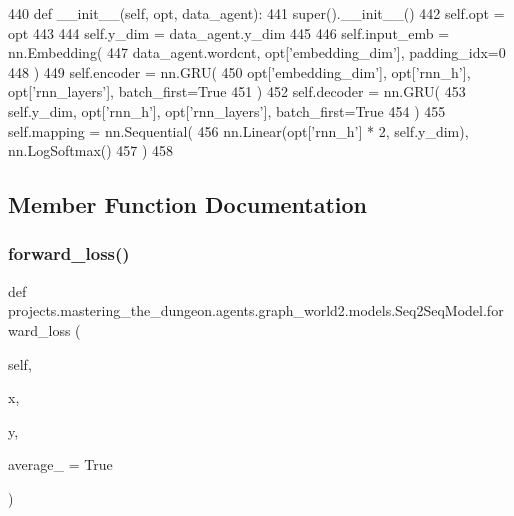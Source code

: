 \begin{DoxyCode}
440     \textcolor{keyword}{def }\_\_init\_\_(self, opt, data\_agent):
441         super().\_\_init\_\_()
442         self.opt = opt
443 
444         self.y\_dim = data\_agent.y\_dim
445 
446         self.input\_emb = nn.Embedding(
447             data\_agent.wordcnt, opt[\textcolor{stringliteral}{'embedding\_dim'}], padding\_idx=0
448         )
449         self.encoder = nn.GRU(
450             opt[\textcolor{stringliteral}{'embedding\_dim'}], opt[\textcolor{stringliteral}{'rnn\_h'}], opt[\textcolor{stringliteral}{'rnn\_layers'}], batch\_first=\textcolor{keyword}{True}
451         )
452         self.decoder = nn.GRU(
453             self.y\_dim, opt[\textcolor{stringliteral}{'rnn\_h'}], opt[\textcolor{stringliteral}{'rnn\_layers'}], batch\_first=\textcolor{keyword}{True}
454         )
455         self.mapping = nn.Sequential(
456             nn.Linear(opt[\textcolor{stringliteral}{'rnn\_h'}] * 2, self.y\_dim), nn.LogSoftmax()
457         )
458 
\end{DoxyCode}


\subsection{Member Function Documentation}
\mbox{\label{classprojects_1_1mastering__the__dungeon_1_1agents_1_1graph__world2_1_1models_1_1Seq2SeqModel_a643150fe7784a20ac0ed2e76ca9fc10a}} 
\subsubsection{\texorpdfstring{forward\+\_\+loss()}{forward\_loss()}}
{\footnotesize\ttfamily def projects.\+mastering\+\_\+the\+\_\+dungeon.\+agents.\+graph\+\_\+world2.\+models.\+Seq2\+Seq\+Model.\+forward\+\_\+loss (\begin{DoxyParamCaption}\item[{}]{self,  }\item[{}]{x,  }\item[{}]{y,  }\item[{}]{average\+\_\+ = {\ttfamily True} }\end{DoxyParamCaption})}

